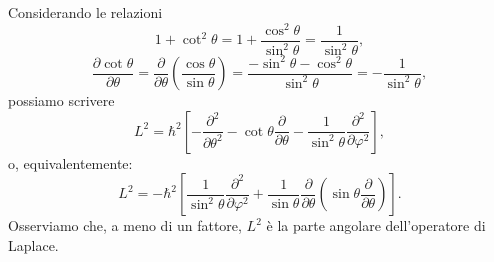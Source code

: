 \documentclass[a4paper,12pt,oneside]{book}
\begin{document}
Considerando le relazioni
\begin{equation}
1+ \cot ^2 \theta = 1+\frac{\cos ^2 \theta}{\sin ^2 \theta} = \frac{1}{\sin ^2 \theta},
\end{equation}
\begin{equation}
\frac{\partial \cot \theta}{\partial \theta}= \frac{\partial}{\partial \theta}\left( \frac{\cos  \theta}{\sin \theta} \right) = \frac{-\sin ^ 2 \theta - \cos ^2 \theta}{\sin ^2 \theta}=-\frac{1}{\sin ^2 \theta},
\end{equation}
possiamo scrivere
\begin{equation}
L^2 = \hbar ^2 \left[- \frac{\partial ^2}{\partial \theta ^2}-\cot \theta \frac{\partial}{\partial \theta}- \frac{1}{\sin ^2 \theta}\frac{\partial ^2}{\partial \varphi ^2}\right] ,
\end{equation}
o, equivalentemente:
\begin{equation}
L^2 = -\hbar ^2 \left[\frac{1}{\sin ^2 \theta}\frac{\partial ^2}{\partial \varphi ^2}+\frac{1}{\sin \theta}\frac{\partial}{\partial \theta} \left(\sin \theta \frac{\partial}{\partial \theta}\right)\right] .
\end{equation}
Osserviamo che, a meno di un fattore, $L^2$ è la parte angolare dell'operatore di Laplace.
\end{document}
